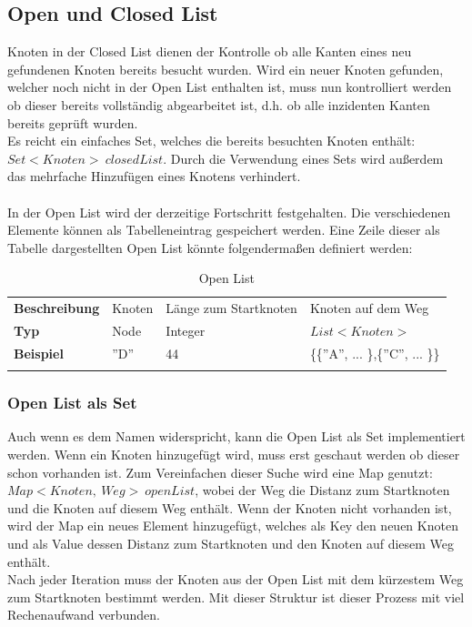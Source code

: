 \documentclass[a4paper]{article}
\begin{document}
\subsection{Open und Closed List}

Knoten in der Closed List dienen der Kontrolle ob alle Kanten eines neu gefundenen Knoten bereits besucht wurden. Wird ein neuer Knoten gefunden, welcher noch nicht in der Open List enthalten ist, muss nun kontrolliert werden ob dieser bereits vollständig abgearbeitet ist, d.h. ob alle inzidenten Kanten bereits geprüft wurden.\\
Es reicht ein einfaches Set, welches die bereits besuchten Knoten enthält: $Set<Knoten>\ closedList$. Durch die Verwendung eines Sets wird außerdem das mehrfache Hinzufügen eines Knotens verhindert.\\\\
In der Open List wird der derzeitige Fortschritt festgehalten. Die verschiedenen Elemente können als Tabelleneintrag gespeichert werden. Eine Zeile dieser als Tabelle dargestellten Open List könnte folgendermaßen definiert werden:

\begin{table}[htbp]
    \centering
    \begin{tabular}{||l|l|l|l||}
    \hhline{|t:====:t|}
    \textbf{Beschreibung}   & Knoten  & Länge zum Startknoten & Knoten auf dem Weg    \\ \hhline{|----|}
    \textbf{Typ}            & Node    & Integer               & $List<Knoten>$        \\ \hhline{|----|}
    \textbf{Beispiel}       & ''D''   & 44                    & \{\{''A'', ... \},\{''C'', ... \}\}           \\ \hhline{|b:====:b|}
    \end{tabular}
    \caption{Open List}
\end{table}

\subsubsection{Open List als Set}

Auch wenn es dem Namen widerspricht, kann die Open List als Set implementiert werden. Wenn ein Knoten hinzugefügt wird, muss erst geschaut werden ob dieser schon vorhanden ist. Zum Vereinfachen dieser Suche wird eine Map genutzt: $Map<Knoten,\ Weg>\ openList$, wobei der Weg die Distanz zum Startknoten und die Knoten auf diesem Weg enthält. Wenn der Knoten nicht vorhanden ist, wird der Map ein neues Element hinzugefügt, welches als Key den neuen Knoten und als Value dessen Distanz zum Startknoten und den Knoten auf diesem Weg enthält.\\
Nach jeder Iteration muss der Knoten aus der Open List mit dem kürzestem Weg zum Startknoten bestimmt werden. Mit dieser Struktur ist dieser Prozess mit viel Rechenaufwand verbunden.
\end{document}

